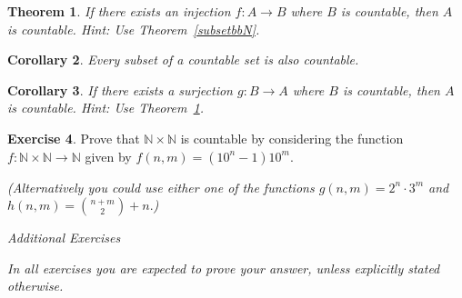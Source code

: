 \documentclass[11pt]{article}
\newcommand{\bbN}{\mathbb{N}}
\newtheorem{theorem}{Theorem}[section]
\newtheorem{corollary}[theorem]{Corollary}
\theoremstyle{definition}
\newtheorem{exercise}[theorem]{Exercise}
\numberwithin{equation}{subsection}
\begin{document}
\begin{theorem}\label{injbbN}
  If there exists an injection $f:A\longrightarrow B$ where $B$ is countable, then $A$ is
  countable. {\it Hint: Use Theorem~\ref{subsetbbN}.}
\end{theorem}

\begin{corollary}
  Every subset of a countable set is also countable.
\end{corollary}

\begin{corollary}
  If there exists a surjection $g\colon B\to A$ where $B$ is countable, then $A$ is countable. {\it
    Hint: Use Theorem~\ref{injbbN}.}
\end{corollary}

\begin{exercise}
Prove that $\bbN\times \bbN$ is countable by considering the function $f:\bbN\times\bbN\longrightarrow \bbN$ given by $f(n,m)=(10^n-1)10^m$.

{\em (Alternatively you could use either one of the functions $  g(n,m) = 2^n\cdot 3^m$ and 
  $h(n,m)  = \binom{n+m}{2} + n.$)}
\end{exercise}
\bigskip

\begin{center}
{\em Additional Exercises}
\end{center}

{\em In all exercises you are expected to prove your answer, unless explicitly stated otherwise.}
\end{document}
